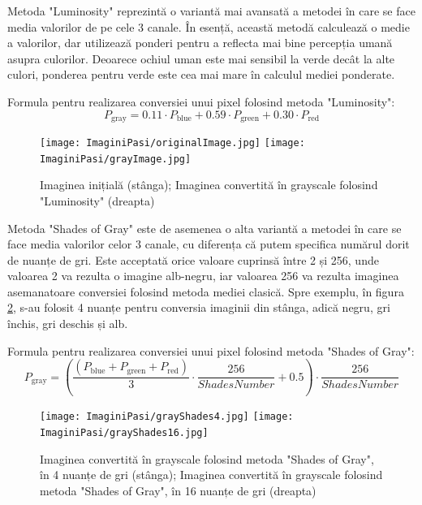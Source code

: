 \documentclass[12pt]{article}
\begin{document}
Metoda "Luminosity" reprezint\u{a} o variant\u{a} mai avansat\u{a} a metodei \^{i}n care se face media valorilor de pe cele 3 canale. \^{I}n esenț\u{a}, aceast\u{a} metod\u{a} calculeaz\u{a} o medie a valorilor, dar utilizeaz\u{a} ponderi pentru a reflecta mai bine percepția uman\u{a} asupra culorilor. Deoarece ochiul uman este mai sensibil la verde dec\^{a}t la alte culori, ponderea pentru verde este cea mai mare \^{i}n calculul mediei ponderate.

Formula pentru realizarea conversiei unui pixel folosind metoda "Luminosity":
\begin{equation}
    P_{\mathrm{gray}}=0.11 \cdot P_\mathrm{blue}+0.59 \cdot P_{\mathrm{green}}+0.30 \cdot P_{\mathrm{red}}
\end{equation}
\begin{figure}[H]
  \centering
  \texttt{[image: ImaginiPasi/originalImage.jpg]}\hfill
  \texttt{[image: ImaginiPasi/grayImage.jpg]}
  \caption{Imaginea inițial\u{a} (st\^{a}nga); Imaginea convertit\u{a} \^{i}n grayscale folosind "Luminosity" (dreapta)}
  \label{fig:conversie_grayscale}
\end{figure}

Metoda "Shades of Gray" este de asemenea o alta variant\u{a} a metodei \^{i}n care se face media valorilor celor 3 canale, cu diferența c\u{a} putem specifica num\u{a}rul dorit de nuanțe de gri. Este acceptat\u{a} orice valoare cuprins\u{a} \^{i}ntre 2 și 256, unde valoarea 2 va rezulta o imagine alb-negru, iar valoarea 256 va rezulta imaginea asemanatoare conversiei folosind metoda mediei clasic\u{a}. Spre exemplu, \^{i}n figura \ref{fig:conversie_grayscale_custom_shades}, s-au folosit 4 nuanțe pentru conversia imaginii din st\^{a}nga, adic\u{a} negru, gri \^{i}nchis, gri deschis și alb.

Formula pentru realizarea conversiei unui pixel folosind metoda "Shades of Gray":
\begin{equation}
    P_{\mathrm{gray}}=(\frac{(P_\mathrm{blue}+P_{\mathrm{green}}+P_{\mathrm{red}})}{3} \cdot \frac{256}{ShadesNumber}+0.5)\cdot \frac{256}{ShadesNumber}
\end{equation}

\begin{figure}[H]
  \centering
  \texttt{[image: ImaginiPasi/grayShades4.jpg]}\hfill
  \texttt{[image: ImaginiPasi/grayShades16.jpg]}
  \caption{Imaginea convertit\u{a} \^{i}n grayscale folosind metoda "Shades of Gray", \^{i}n 4 nuanțe de gri (st\^{a}nga); Imaginea convertit\u{a} \^{i}n grayscale folosind metoda "Shades of Gray", \^{i}n 16 nuanțe de gri (dreapta)}
  \label{fig:conversie_grayscale_custom_shades}
\end{figure}
\end{document}
